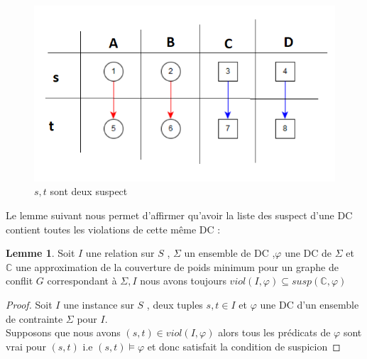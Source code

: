 \documentclass[letterpaper, 12pt]{report}
\theoremstyle{definition}
\newtheorem{mylemma}{Lemme}
\begin{document}
\begin{figure}
\centering
\includegraphics[scale=1]{img/suspect1.png}
\caption{\label{suspect1} $s,t$ sont deux suspect }
\end{figure}

Le lemme suivant nous permet d'affirmer qu'avoir la liste des suspect d'une DC contient toutes les violations de cette même DC \cite{main} :
\begin{mylemma}
Soit $I$ une relation sur $S$ , $\Sigma$ un ensemble de DC ,$\varphi$ une DC de $\Sigma$ et $\mathbb{C}$ une approximation de la couverture de poids minimum pour un graphe de conflit $G$ correspondant à  $\Sigma,I$ nous avons toujours $viol(I,\varphi) \subseteq susp(\mathbb{C},\varphi)$
 \end{mylemma}
 
 \begin{proof}
 Soit $I$ une instance sur $S$ , deux tuples $s,t \in I$ et $\varphi$ une DC d'un ensemble de contrainte $\Sigma$ pour $I$.\\
 Supposons que nous avons $(s,t) \in viol(I,\varphi)$ alors tous les prédicats de $\varphi$ sont vrai pour $(s,t)$ i.e $(s,t) \models \varphi$ et donc satisfait la condition de suspicion
 \end{proof}
 
\end{document}
